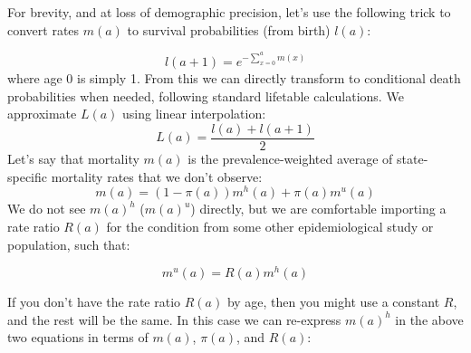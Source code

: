 \documentclass[sn-apa]{sn-jnl}%
\theoremstyle{thmstyleone}%
\theoremstyle{thmstyletwo}%
\theoremstyle{thmstylethree}%
\begin{document}
For brevity, and at loss of demographic precision, let's use the following trick to convert rates $m(a)$ to survival probabilities (from birth) $l(a)$:

\begin{equation}
\label{eq:mx2lx}
l(a+1) = e^{-\sum_{x=0}^{a} m(x)}
\end{equation}
where age 0 is simply 1. From this we can directly transform to conditional death probabilities when needed, following standard lifetable calculations. We approximate $L(a)$ using linear interpolation:
\begin{equation}
\label{eq:Lx}
L(a) = \frac{l(a)+l(a+1)}{2}
\end{equation}
Let's say that mortality $m(a)$ is the prevalence-weighted average of state-specific mortality rates that we don't observe:
\begin{equation}
m(a) = (1-\pi(a))m^h(a) + \pi(a)m^u(a)
\end{equation}
We do not see $m(a)^h$ ($m(a)^u$) directly, but we are comfortable importing a rate ratio $R(a)$ for the condition from some other epidemiological study or population, such that:

\begin{equation}
\label{eq:mua}
m^u(a) = R(a)m^h(a)
\end{equation}

If you don't have the rate ratio $R(a)$ by age, then you might use a constant $R$, and the rest will be the same. In this case we can re-express $m(a)^h$ in the above two equations in terms of $m(a)$, $\pi(a)$, and $R(a)$:
\end{document}
